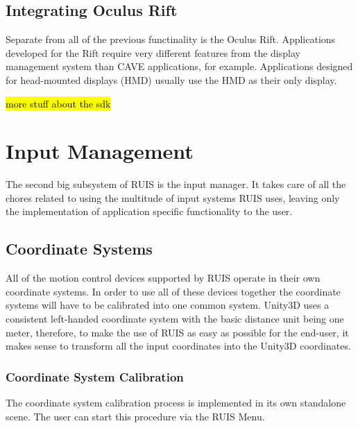 \documentclass[12pt,a4paper,oneside,pdftex]{report}
\begin{document}
\section{Integrating Oculus Rift}
\label{section:integratingoculusrift}

Separate from all of the previous functinality is the Oculus Rift. Applications developed for the Rift require very different features from the display management system than CAVE applications, for example. Applications designed for head-mounted displays (HMD) usually use the HMD as their only display. 

\hl{more stuff about the sdk}



\chapter{Input Management}
\label{chapter:inputmanagement}

The second big subsystem of RUIS is the input manager. It takes care of all the chores related to using the multitude of input systems RUIS uses, leaving only the implementation of application specific functionality to the user.

\section{Coordinate Systems}
\label{section:coordinatesystem}

All of the motion control devices supported by RUIS operate in their own coordinate systems. In order to use all of these devices together the coordinate systems will have to be calibrated into one common system. Unity3D uses a consistent left-handed coordinate system with the basic distance unit being one meter, therefore, to make the use of RUIS as easy as possible for the end-user, it makes sense to transform all the input coordinates into the Unity3D coordinates.

\subsection{Coordinate System Calibration}
\label{subsection:coordinatesystems:calibration}

The coordinate system calibration process is implemented in its own standalone scene. The user can start this procedure via the RUIS Menu. 
\end{document}
